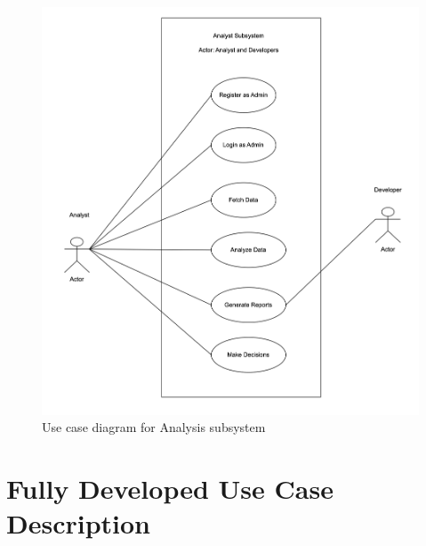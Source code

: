 \begin{figure}[h!t]
    \centering
    \includegraphics[width=\textwidth]{images/ucAnaysis.png}
    \caption{Use case diagram for Analysis subsystem}
    \label{fig:ucAnaysis}
\end{figure}

\FloatBarrier

\section{Fully Developed Use Case Description}

